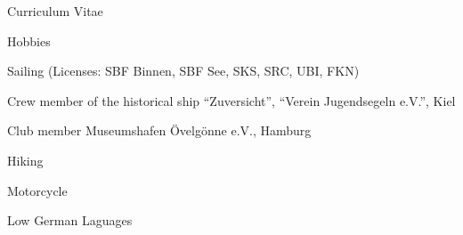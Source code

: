 \documentclass[11pt,a4paper]{scrartcl}
\begin{document}
\begin{cv}{Curriculum Vitae}

\begin{cvlist}{Hobbies}
\item Sailing (Licenses: SBF Binnen, SBF See, SKS, SRC, UBI, FKN)
\item Crew member of the historical ship "`Zuversicht"', "`Verein
Jugendsegeln e.V."', Kiel
\item Club member Museumshafen \"Ovelg\"onne e.V., Hamburg
\item Hiking
\item Motorcycle
\item Low German Laguages
\end{cvlist}


\date{\today}

\end{cv}
\end{document}
